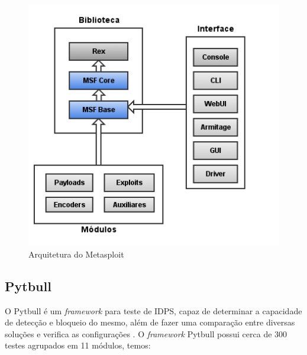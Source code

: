 \documentclass[
	12pt,				
	openright,		
	twoside,	
	a4paper,
	english,	
	brazil	
	]{abntex2}
\begin{document}
\begin{figure}[!htp]
 \centering
 \includegraphics[scale=.6]{metasploit_arquitetura.png}
 \caption{Arquitetura do Metasploit}
 \label{fig:arqmetasploit}
\end{figure}

\subsection{Pytbull} \label{sec:pytbull}

O Pytbull é um \textit{framework} para teste de IDPS, capaz de determinar a capacidade de detecção e bloqueio do mesmo, além de fazer uma comparação entre diversas soluções e verifica as configurações \cite{pytbull}. O \textit{framework} Pytbull possui cerca de 300 testes agrupados em 11 módulos, temos:
\end{document}
